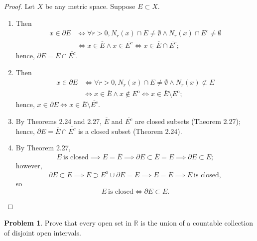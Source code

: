 \documentclass{amsart}
\theoremstyle{definition}
\newtheorem{problem}{Problem}
\begin{document}
\begin{proof}
    Let $X$ be any metric space. Suppose $E \subset X$.
    \begin{enumerate}[label = (\alph*)]
         \item Then
         \begin{align*}
            x \in \partial E &\iff \forall r > 0, N_r(x) \cap E \neq \emptyset \land N_r(x) \cap E^{c} \neq \emptyset \\
            &\iff x \in \overline{E} \land x \in \overline{E^c} \iff x \in \overline{E} \cap \overline{E^c}; 
         \end{align*}
         hence, $\partial E = \overline{E} \cap \overline{E^c}$.
         \item Then
         \begin{align*}
             x \in \partial E &\iff \forall r > 0, N_r(x) \cap E \neq \emptyset \land N_r(x) \not \subset E \\
             &\iff x \in \overline{E} \land x \notin E^{\mathrm{o}} \iff x \in \overline{E} \setminus E^{\mathrm{o}};
         \end{align*}
         hence, $x \in \partial E \iff x \in \overline{E} \setminus \overline{E^c}$.
         \item By Theorems 2.24 and 2.27, $\overline{E}$ and $\overline{E^c}$ are closed subsets (Theorem 2.27); hence, $\partial E = \overline{E} \cap \overline{E^c}$ is a closed subset (Theorem 2.24).
         \item By Theorem 2.27,
         \[
         E \ \text{is closed} \implies E = \overline{E} \implies \partial E \subset \overline{E} = E \implies \partial E \subset E;
         \]
         however,
         \[
         \partial E \subset E \implies E \supset E^{\mathrm{o}} \cup \partial E = \overline{E} \implies E = \overline{E} \implies E \ \text{is closed},
         \]
         so
         \[
         E \ \text{is closed} \iff \partial E \subset E.
         \]
    \end{enumerate}
\end{proof}

\begin{problem}
    Prove that every open set in $\mathbb{R}$ is the union of a countable collection of disjoint open intervals.
\end{problem}
\end{document}
